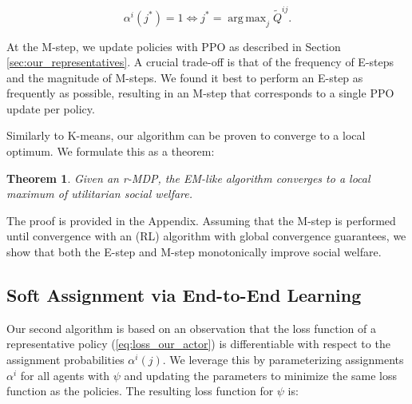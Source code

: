\documentclass[letterpaper]{article} %
\DeclareMathOperator*{\argmax}{arg\,max}
\DeclareMathOperator*{\clip}{clip}
\newtheorem{theorem}{Theorem}
\begin{document}
\begin{equation}\label{eq:hard_E_step}
    \alpha^i(j^*) = 1 \iff j^* = \argmax_j \tilde{Q}^{ij}.
\end{equation}



At the M-step, we update policies with PPO as described in Section \ref{sec:our_representatives}. A crucial trade-off is that of the frequency of E-steps and the magnitude of M-steps. We found it best to perform an E-step as frequently as possible, resulting in an M-step that corresponds to a single PPO update per policy.


Similarly to K-means, our algorithm can be proven to converge to a local optimum. We formulate this as a theorem:

\begin{theorem}\label{theorem}
    Given an r-MDP, the EM-like algorithm converges to a local maximum of utilitarian social welfare.
\end{theorem}

\noindent The proof is provided in the Appendix. Assuming that the M-step is performed until convergence with an (RL) algorithm with global convergence guarantees, we show that both the E-step and M-step monotonically improve social welfare.





\subsection{Soft Assignment via End-to-End Learning}\label{sec:our_soft}

Our second algorithm is based on an observation that the loss function of a representative policy (\ref{eq:loss_our_actor}) is differentiable with respect to the assignment probabilities $\alpha^i(j)$. We leverage this by parameterizing assignments $\alpha^i$ for all agents with $\psi$ and updating the parameters to minimize the same loss function as the policies. The resulting loss function for $\psi$ is:

\end{document}
